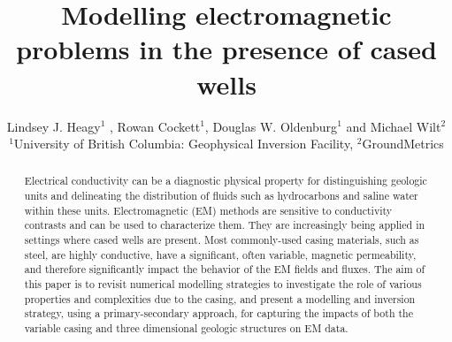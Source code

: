 \documentclass{segabs}
\begin{document}
\title{Modelling electromagnetic problems in the presence of cased wells} %

\author{Lindsey J. Heagy$^1$ \footnotemark[1], Rowan Cockett$^1$, Douglas W. Oldenburg$^1$ and Michael Wilt$^2$ \\ $^1$University of British Columbia: Geophysical Inversion Facility, $^2$GroundMetrics}


\maketitle

\begin{abstract}
	Electrical conductivity can be a diagnostic physical property for distinguishing geologic units and delineating the distribution of fluids such as hydrocarbons and saline water within these units. Electromagnetic (EM) methods are sensitive to conductivity contrasts and can be used to characterize them. They are increasingly being applied in settings where cased wells are present. Most commonly-used casing materials, such as steel, are highly conductive, have a significant, often variable, magnetic permeability, and therefore significantly impact the behavior of the EM fields and fluxes. The aim of this paper is to revisit numerical modelling strategies to investigate the role of various properties and complexities due to the casing, and present a modelling and inversion strategy, using a primary-secondary approach, for capturing the impacts of both the variable casing and three dimensional geologic structures on EM data.
\vspace{-8pt}
\end{abstract}

\vspace{-8pt}
\end{document}
